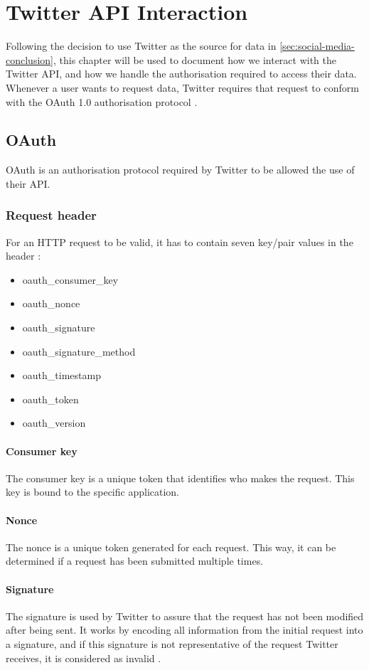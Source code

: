 \chapter{Twitter API Interaction}\label{cha:twitterAPI}
Following the decision to use Twitter as the source for data in
\autoref{sec:social-media-conclusion}, this chapter will be used to document how
we interact with the Twitter API, and how we handle the authorisation required
to access their data. Whenever a user wants to request data, Twitter requires
that request to conform with the OAuth 1.0 authorisation protocol \citep{OAuth1}.

\section{OAuth}
OAuth is an authorisation protocol required by Twitter to be allowed the use of
their \ac{API}.

\subsection{Request header}
For an \ac{HTTP} request to be valid, it has to contain seven key/pair values in
the header \citep{TwitterAPIAuth}:
\begin{itemize}
  \item oauth\_consumer\_key
  \item oauth\_nonce
  \item oauth\_signature
  \item oauth\_signature\_method
  \item oauth\_timestamp
  \item oauth\_token
  \item oauth\_version
\end{itemize}

\subsubsection*{Consumer key}
The consumer key is a unique token that identifies who makes the request.
This key is bound to the specific application.

\subsubsection*{Nonce}
The nonce is a unique token generated for each request. This way, it can be
determined if a request has been submitted multiple times. 

\subsubsection*{Signature}
The signature is used by Twitter to assure that the request has not been
modified after being sent. It works by encoding all information from the initial
request into a signature, and if this signature is not representative of the
request Twitter receives, it is considered as invalid \citep[sec 3.4]{OAuth1}.

